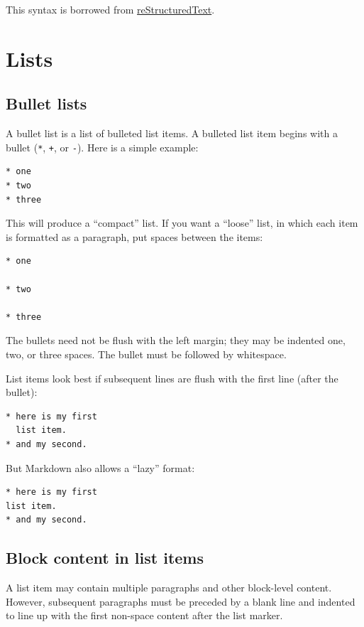 \documentclass[
  b5paper
]{book}
\begin{document}
This syntax is borrowed from
\href{https://docutils.sourceforge.io/docs/ref/rst/introduction.html}{reStructuredText}.

\section{Lists}\label{lists}

\subsection{Bullet lists}\label{bullet-lists}

A bullet list is a list of bulleted list items. A bulleted list item
begins with a bullet (\texttt{*}, \texttt{+}, or \texttt{-}). Here is a
simple example:

\begin{verbatim}
* one
* two
* three
\end{verbatim}

This will produce a ``compact'' list. If you want a ``loose'' list, in
which each item is formatted as a paragraph, put spaces between the
items:

\begin{verbatim}
* one

* two

* three
\end{verbatim}

The bullets need not be flush with the left margin; they may be indented
one, two, or three spaces. The bullet must be followed by whitespace.

List items look best if subsequent lines are flush with the first line
(after the bullet):

\begin{verbatim}
* here is my first
  list item.
* and my second.
\end{verbatim}

But Markdown also allows a ``lazy'' format:

\begin{verbatim}
* here is my first
list item.
* and my second.
\end{verbatim}

\subsection{Block content in list
items}\label{block-content-in-list-items}

A list item may contain multiple paragraphs and other block-level
content. However, subsequent paragraphs must be preceded by a blank line
and indented to line up with the first non-space content after the list
marker.
\end{document}
